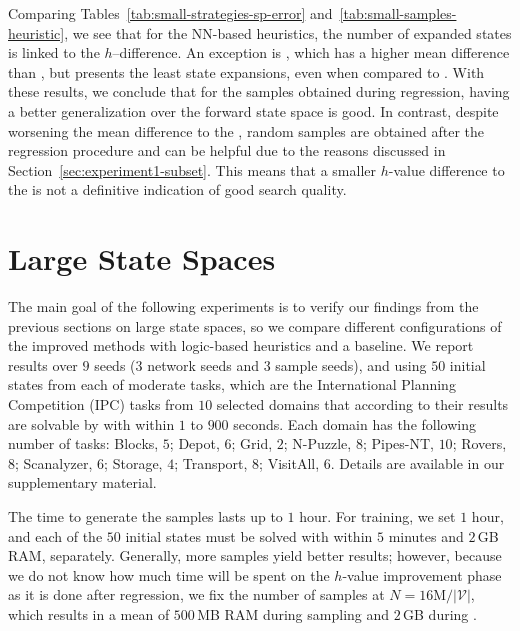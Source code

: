 Comparing Tables~\ref{tab:small-strategies-sp-error} and~\ref{tab:small-samples-heuristic}, we see that for the NN-based heuristics, the number of expanded states is linked to the $h$--\hstar difference. An exception is \hnnrs, which has a higher mean difference than \hnnbfsrwl{\meanfx}, but presents the least state expansions, even when compared to \hff. With these results, we conclude that for the samples obtained during regression, having a better generalization over the forward state space is good. In contrast, despite worsening the mean difference to the \fssp, random samples are obtained after the regression procedure and can be helpful due to the reasons discussed in Section~\ref{sec:experiment1-subset}. This means that a smaller $h$-value difference to the \fssp is not a definitive indication of good search quality.





\section{Large State Spaces}
\label{sec:experiment2}

The main goal of the following experiments is to verify our findings from the previous sections on large state spaces, so we compare different configurations of the improved methods with logic-based heuristics and a baseline. We report results over $9$ seeds ($3$ network seeds and $3$ sample seeds), and using $50$ initial states from each of \citeyear{Ferber.etal/2022} moderate tasks, which are the International Planning Competition (IPC) tasks from $10$ selected domains that according to their results are solvable by \gbfs with \hff within $1$ to $900$ seconds. Each domain has the following number of tasks: Blocks, $5$; Depot, $6$; Grid, $2$; N-Puzzle, $8$; Pipes-NT, $10$; Rovers, $8$; Scanalyzer, $6$; Storage, $4$; Transport, $8$; VisitAll, $6$. Details are available in our supplementary material.

The time to generate the samples lasts up to $1$ hour. For training, we set $1$ hour, and each of the $50$ initial states must be solved with \gbfs within $5$ minutes and $2$\,GB RAM, separately. Generally, more samples yield better results; however, because we do not know how much time will be spent on the $h$-value improvement \hvfc phase as it is done after regression, we fix the number of samples at $N = 16\text{M} / |\mathcal{V}|$, which results in a mean of $500$\,MB RAM during sampling and $2$\,GB during \hvfc.

